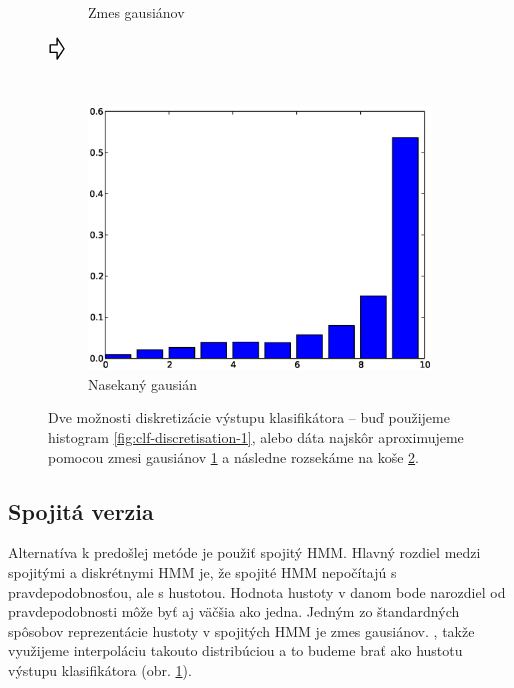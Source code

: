 \begin{figure}[htp]
\begin{subfigure}[c]{0.3\textwidth}
                \caption{Zmes gausiánov}
                \label{fig:clf-discretisation-2}
        \end{subfigure}
        $\vcenter{\hbox{\raisebox{.8cm}{\Huge\pointer}}}$
        \begin{subfigure}[c]{0.3\textwidth}
                \includegraphics[width=\textwidth]{images/hist3}
                \caption{Nasekaný gausián}
                \label{fig:clf-discretisation-3}
        \end{subfigure}
        \caption[Diskretizácia výstupu klasifikátora]{Dve možnosti diskretizácie výstupu klasifikátora -- buď použijeme histogram \ref{fig:clf-discretisation-1}, alebo dáta najskôr aproximujeme pomocou zmesi gausiánov \ref{fig:clf-discretisation-2} a následne rozsekáme na koše \ref{fig:clf-discretisation-3}.}
        \label{fig:clf-discretisation}
\end{figure}

\subsection{Spojitá verzia}

Alternatíva k predošlej metóde je použiť spojitý HMM. Hlavný rozdiel medzi spojitými a diskrétnymi HMM je, že spojité HMM nepočítajú s pravdepodobnosťou, ale s hustotou. Hodnota hustoty v danom bode narozdiel od pravdepodobnosti môže byť aj väčšia ako jedna. Jedným zo štandardných spôsobov reprezentácie hustoty v spojitých HMM je zmes gausiánov. \cite{huang1989multiple}, takže využijeme interpoláciu takouto distribúciou a to budeme brať ako hustotu výstupu klasifikátora (obr. \ref{fig:clf-discretisation-2}).


